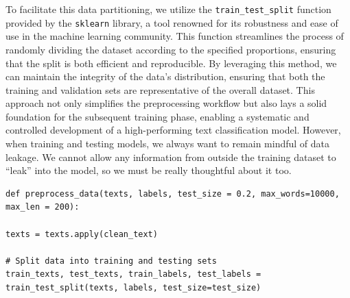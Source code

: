 To facilitate this data partitioning, we utilize the \verb|train_test_split| function provided by the \verb|sklearn| library, a tool renowned for its robustness and ease of use in the machine learning community. This function streamlines the process of randomly dividing the dataset according to the specified proportions, ensuring that the split is both efficient and reproducible. By leveraging this method, we can maintain the integrity of the data's distribution, ensuring that both the training and validation sets are representative of the overall dataset. This approach not only simplifies the preprocessing workflow but also lays a solid foundation for the subsequent training phase, enabling a systematic and controlled development of a high-performing text classification model. However, when training and testing models, we always want to remain mindful of data leakage. We cannot allow any information from outside the training dataset to “leak” into the model, so we must be really thoughtful about it too. \\

\begin{lstlisting}
def preprocess_data(texts, labels, test_size = 0.2, max_words=10000, max_len = 200):
	
texts = texts.apply(clean_text)
	
# Split data into training and testing sets
train_texts, test_texts, train_labels, test_labels = train_test_split(texts, labels, test_size=test_size)
\end{lstlisting}

